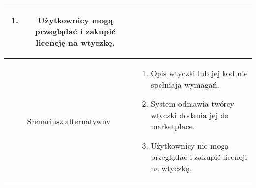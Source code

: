 \documentclass{article}
\begin{document}
\begin{enumerate}
\begin{enumerate}
\begin{table}[H]
\begin{tabular}{|c|p{7cm}|}
\begin{enumerate}
\item Użytkownicy mogą przeglądać i zakupić licencję na wtyczkę.\end{enumerate}                                                                             \\
						\hline
						Scenariusz alternatywny & \begin{enumerate}\item Opis wtyczki lub jej kod nie spełniają wymagań.

\item System odmawia twórcy wtyczki dodania jej do marketplace.

\item Użytkownicy nie mogą przeglądać i zakupić licencji na wtyczkę.\end{enumerate} \\
						\hline
					\end{tabular}
				\end{table}


\end{enumerate}
\end{enumerate}
\end{document}
